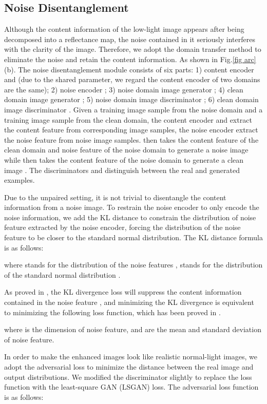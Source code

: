 \documentclass[journal]{IEEEtran}
\begin{document}
\subsection{Noise Disentanglement}
\label{noise}
Although the content information of the low-light image appears after being decomposed into a reflectance map, the noise contained in it seriously interferes with the clarity of the image. Therefore, we adopt the domain transfer method to eliminate the noise and retain the content information. As shown in Fig.\ref{fig arc}(b). The noise disentanglement module consists of six parts: 1) content encoder  and (due to the shared parameter, we regard the content encoder of two domains are the same); 2) noise encoder ; 3) noise domain image generator ; 4) clean domain image generator ; 5) noise domain image discriminator ; 6) clean domain image discriminator . Given a training image sample  from the noise domain and a training image sample  from the clean domain, the content encoder  and  extract the content feature from corresponding image samples, the noise encoder  extract the noise feature from noise image samples.  then takes the content feature of the clean domain and noise feature of the noise domain to generate a noise image  while  then takes the content feature of the noise domain to generate a clean image . The discriminators  and  distinguish between the real and generated examples.

Due to the unpaired setting, it is not trivial to disentangle the content information from a noise image. To restrain the noise encoder to only encode the noise information, we add the KL distance to constrain the distribution of noise feature extracted by the noise encoder, forcing the distribution of the noise feature to be closer to the standard normal distribution. The KL distance formula is as follows:

\noindent where  stands for the distribution of the noise features ,  stands for the distribution of the standard normal distribution . 

As proved in \cite{kingma2013auto}, the KL divergence loss will suppress the content information contained in the noise feature , and minimizing the KL divergence is equivalent to minimizing the following loss function, which has been proved in \cite{bao2018towards}.

\noindent where  is the dimension of noise feature,  and  are the mean and standard deviation of noise feature. 

In order to make the enhanced images look like realistic normal-light images, we adopt the adversarial loss to minimize the distance between the real image and output distributions. We modified the discriminator slightly to replace the loss function with the least-square GAN (LSGAN) loss. The adversarial loss function is as follows:
\vspace{-1mm}
\end{document}
